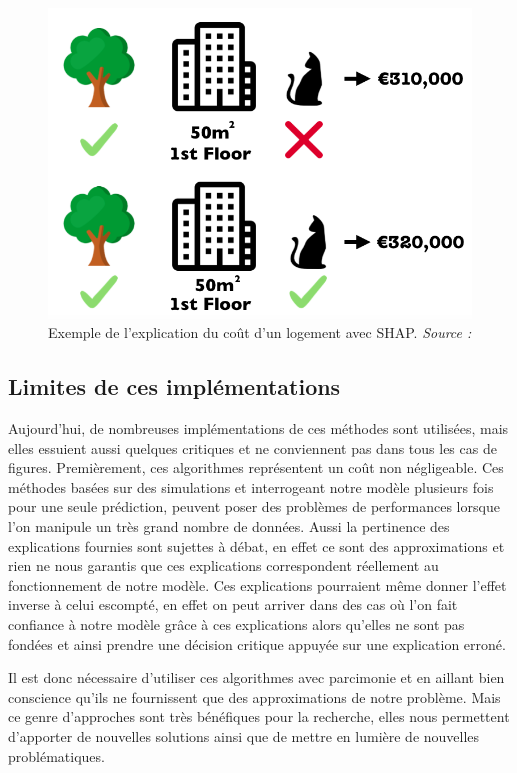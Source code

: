 \begin{figure}[h]
\centering
\includegraphics[scale=0.3]{src_img/shapleyExemple.png}
\caption{Exemple de l'explication du coût d'un logement avec SHAP. \textit{Source : \cite{molnar2019}}}
\label{shapleyExemple}
\end{figure}

\subsection{Limites de ces implémentations}
Aujourd'hui, de nombreuses implémentations de ces méthodes sont utilisées, mais elles essuient aussi quelques critiques et ne conviennent pas dans tous les cas de figures. Premièrement, ces algorithmes représentent un coût non négligeable. Ces méthodes basées sur des simulations et interrogeant notre modèle plusieurs fois pour une seule prédiction, peuvent poser des problèmes de performances lorsque l'on manipule un très grand nombre de données. Aussi la pertinence des explications fournies sont sujettes à débat, en effet ce sont des approximations et rien ne nous garantis que ces explications correspondent réellement au fonctionnement de notre modèle. Ces explications pourraient même donner l'effet inverse à celui escompté, en effet on peut arriver dans des cas où l'on fait confiance à notre modèle grâce à ces explications alors qu'elles ne sont pas fondées et ainsi prendre une décision critique appuyée sur une explication erroné.\par

Il est donc nécessaire d'utiliser ces algorithmes avec parcimonie et en aillant bien conscience qu'ils ne fournissent que des approximations de notre problème. Mais ce genre d'approches sont très bénéfiques pour la recherche, elles nous permettent d'apporter de nouvelles solutions ainsi que de mettre en lumière de nouvelles problématiques.
